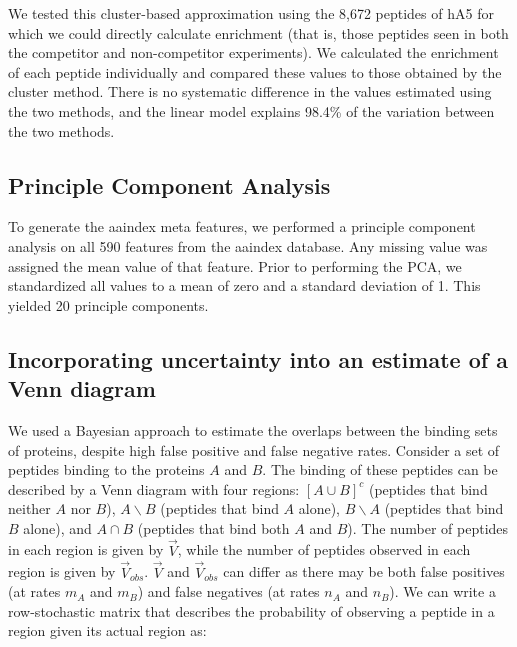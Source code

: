 We tested this cluster-based approximation using the 8,672 peptides
of hA5 for which we could directly calculate enrichment (that is,
those peptides seen in both the competitor and non-competitor experiments).
We calculated the enrichment of each peptide individually and compared
these values to those obtained by the cluster method. There is no
systematic difference in the values estimated using the two methods,
and the linear model explains 98.4\% of the variation between the
two methods.

\subsection{Principle Component Analysis}

To generate the aaindex meta features, we performed a principle component
analysis on all 590 features from the aaindex database. Any missing
value was assigned the mean value of that feature. Prior to performing
the PCA, we standardized all values to a mean of zero and a standard
deviation of 1. This yielded 20 principle components. 

\subsection{Incorporating uncertainty into an estimate of a Venn diagram}

We used a Bayesian approach to estimate the overlaps between the binding
sets of proteins, despite high false positive and false negative rates.
Consider a set of peptides binding to the proteins $A$ and $B$.
The binding of these peptides can be described by a Venn diagram with
four regions: $[A\cup B]^{c}$ (peptides that bind neither $A$ nor
$B$), $A\backslash B$ (peptides that bind $A$ alone), $B\backslash A$
(peptides that bind $B$ alone), and $A\cap B$ (peptides that bind
both $A$ and $B$). The number of peptides in each region is given
by $\vec{V}$, while the number of peptides observed in each region
is given by $\vec{V}_{obs}$. $\vec{V}$ and $\vec{V}_{obs}$ can
differ as there may be both false positives (at rates $m_{A}$ and
$m_{B}$) and false negatives (at rates $n_{A}$ and $n_{B}$). We
can write a row-stochastic matrix that describes the probability of
observing a peptide in a region given its actual region as:


